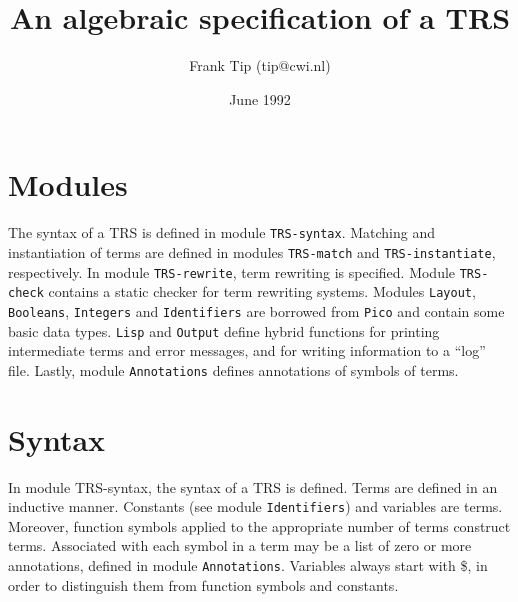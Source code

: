 \setlength{\textwidth}{15cm}
\setlength{\oddsidemargin}{0.46cm}
\setlength{\evensidemargin}{0.46cm}


\title{\bf An algebraic specification of a TRS}
\author{Frank Tip (tip@cwi.nl)}
\date{June 1992}
\maketitle
%
\section{Modules}

The syntax of a TRS is defined in module {\tt TRS-syntax}. Matching and
instantiation of terms are defined in modules {\tt TRS-match} and
{\tt TRS-instantiate}, respectively. In module {\tt TRS-rewrite}, term
rewriting is specified. Module {\tt TRS-check} contains a static checker
for term rewriting systems. Modules {\tt Layout}, {\tt Booleans},
{\tt Integers} and {\tt Identifiers} are borrowed from {\tt Pico} and
contain some basic data types. {\tt Lisp} and {\tt Output} define hybrid
functions for printing intermediate terms and error messages, and for
writing information to a ``log'' file. Lastly, module {\tt Annotations}
defines annotations of symbols of terms.

\section{Syntax}

In module TRS-syntax, the syntax of a TRS is defined. Terms are defined in
an inductive manner. Constants (see module {\tt Identifiers}) and variables
are terms. Moreover, function symbols applied to the appropriate number of
terms construct terms. Associated with each symbol in a term may be a list
of zero or more annotations, defined in module {\tt Annotations}.
Variables always start with \$, in order to distinguish them from
function symbols and constants.

